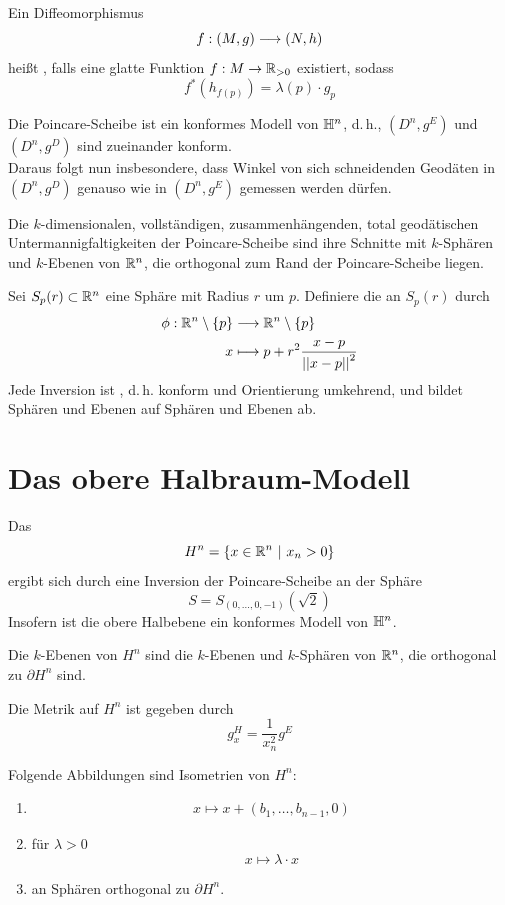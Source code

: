 \documentclass{book}
\begin{document}
\Def{}
Ein Diffeomorphismus
\[ f : (M,g) \overset{}{\longrightarrow} (N,h) \] 
heißt , falls eine glatte Funktion $f : M \overset{}{\rightarrow} \mathbb{R}_{>0}$ existiert, sodass
\[ f^*(h_{f(p)}) = \lambda(p)\cdot g_p  \]

\Bem{}
Die Poincare-Scheibe ist ein konformes Modell von $\mathbb{H}^n$, d.\,h., $(D^n, g^E)$ und $(D^n, g^D)$ sind zueinander konform.\\
Daraus folgt nun insbesondere, dass Winkel von sich schneidenden Geodäten in $(D^n, g^D)$ genauso wie in $(D^n, g^E)$ gemessen werden dürfen.

\Lem{}
Die $k$-dimensionalen, vollständigen, zusammenhängenden, total geodätischen Untermannigfaltigkeiten der Poincare-Scheibe sind ihre Schnitte mit $k$-Sphären und $k$-Ebenen von $\mathbb{R}^n$, die orthogonal zum Rand der Poincare-Scheibe liegen.

\Def{}
Sei $S_{p}(r) \subset \mathbb{R}^n$ eine Sphäre mit Radius $r$ um $p$. Definiere die  an $S_p(r)$ durch
\begin{align*}
\phi : \mathbb{R}^n\setminus\{p\} & \overset{}{\longrightarrow} \mathbb{R}^n\setminus\{p\}\\
x & \longmapsto p + r^2\frac{x- p}{\left|\left|x-p\right|\right|^2}
\end{align*}
\Prop{}
Jede Inversion ist , d.\,h. konform und Orientierung umkehrend, und bildet Sphären und Ebenen auf Sphären und Ebenen ab.

\section{Das obere Halbraum-Modell}
\Def{}
Das 
\[ H^n = \set{x \in \R^{n}}{x_n > 0} \]
ergibt sich durch eine Inversion der Poincare-Scheibe an der Sphäre
\[ S = S_{(0,\ldots,0,-1)}(\sqrt{2}) \]
Insofern ist die obere Halbebene ein konformes Modell von $\mathbb{H}^n$.

\Prop{}
Die $k$-Ebenen von $H^n$ sind die $k$-Ebenen und $k$-Sphären von $\mathbb{R}^n$, die orthogonal zu $\partial H^n$ sind.

\Prop{}
Die Metrik auf $H^n$ ist gegeben durch
\[ g_x^H =  \frac{1}{x_n^2} g^E \]


\Prop{}
Folgende Abbildungen sind Isometrien von $H^n$:
\begin{enumerate}[1.)]
\item {}
\begin{align*}
x \longmapsto x + (b_1,\ldots, b_{n-1}, 0)
\end{align*}
\item {} für $\lambda > 0$
\[ x \longmapsto \lambda \cdot x \]
\item {} an Sphären orthogonal zu $\partial H^n$.
\end{enumerate}
\end{document}
